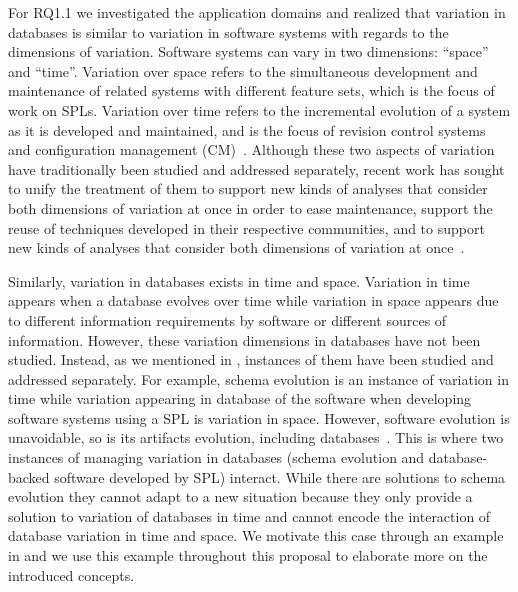 For RQ1.1 
we investigated the application domains and realized that variation
in databases is similar to variation in software systems with regards
to the dimensions of variation.
%
Software systems can vary in two dimensions: ``space'' and ``time''.
Variation over space refers to the simultaneous development and maintenance of
related systems with different feature sets, which is the focus of work on
SPLs.
%
Variation over time refers to the incremental evolution of a system as it is
developed and maintained, and is the focus of revision control systems and
configuration management (CM)~\cite{Dart91}.
%
Although these two aspects of variation have traditionally been studied and
addressed separately, recent work has sought to unify the treatment of them
to support new kinds
of analyses that consider both dimensions of variation at once
in order to ease maintenance, support the reuse of
techniques developed in their respective communities, and to support new kinds
of analyses that consider both dimensions of variation at once~\cite{Thu19vv}.
%



Similarly, variation in databases exists in time and space. 
Variation in time  appears when a database evolves 
over time while variation in space  appears due
to different information requirements by software or different
sources of information. 
%
However, these variation dimensions in databases have not
been studied. Instead, as we mentioned in ,
instances of them have been studied and addressed separately. 
%
For example, schema evolution is an instance of variation in
time while variation appearing in database of the software 
when developing software systems using a SPL is variation in 
space.
%
However, software evolution is unavoidable, so is its artifacts evolution, 
including databases~\cite{dbSPLevolve}.
This is where two instances of managing 
variation in databases (schema evolution and database-backed software 
developed by SPL) interact.
While there are solutions to schema evolution
they cannot adapt to a new situation because they only provide a solution to
variation of databases in time and cannot encode the interaction of database variation in
time and space.
We motivate this case through an example in  and we use this
example throughout this proposal to elaborate more on the introduced 
concepts. 

